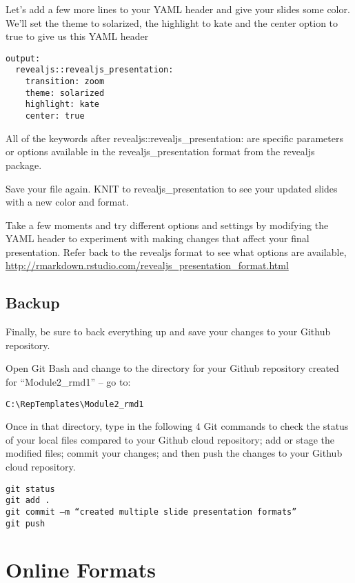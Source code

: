 \documentclass[
]{book}
\begin{document}
Let's add a few more lines to your YAML header and give your slides some color. We'll set the theme to solarized, the highlight to kate and the center option to true to give us this YAML header

\begin{verbatim}
output: 
  revealjs::revealjs_presentation:
    transition: zoom
    theme: solarized
    highlight: kate
    center: true
\end{verbatim}

All of the keywords after revealjs::revealjs\_presentation: are specific parameters or options available in the revealjs\_presentation format from the revealjs package.

Save your file again. KNIT to revealjs\_presentation to see your updated slides with a new color and format.

Take a few moments and try different options and settings by modifying the YAML header to experiment with making changes that affect your final presentation. Refer back to the revealjs format to see what options are available, \url{http://rmarkdown.rstudio.com/revealjs_presentation_format.html}

\hypertarget{backup}{%
\section{Backup}\label{backup}}

Finally, be sure to back everything up and save your changes to your Github repository.

Open Git Bash and change to the directory for your Github repository created for ``Module2\_rmd1'' -- go to:

\texttt{C:\textbackslash{}RepTemplates\textbackslash{}Module2\_rmd1}

Once in that directory, type in the following 4 Git commands to check the status of your local files compared to your Github cloud repository; add or stage the modified files; commit your changes; and then push the changes to your Github cloud repository.

\begin{verbatim}
git status
git add .
git commit –m “created multiple slide presentation formats”
git push
\end{verbatim}

\hypertarget{online}{%
\chapter{Online Formats}\label{online}}
\end{document}
